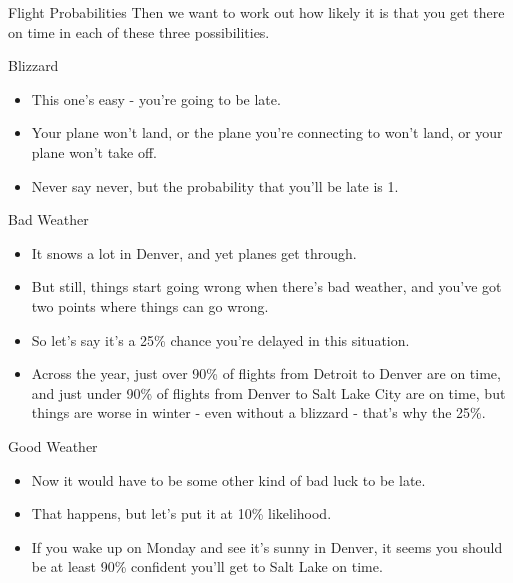 \documentclass[
  ignorenonframetext,
]{beamer}
\providecommand{\tightlist}{%
  \setlength{\itemsep}{0pt}\setlength{\parskip}{0pt}}
\renewcommand{\,}{\text{, }}
\begin{document}
\begin{frame}{Flight Probabilities}
\protect\hypertarget{flight-probabilities}{}
Then we want to work out how likely it is that you get there on time in
each of these three possibilities.
\end{frame}

\begin{frame}{Blizzard}
\protect\hypertarget{blizzard}{}
\begin{itemize}
\tightlist
\item
  This one's easy - you're going to be late.
\item
  Your plane won't land, or the plane you're connecting to won't land,
  or your plane won't take off.
\item
  Never say never, but the probability that you'll be late is 1.
\end{itemize}
\end{frame}

\begin{frame}{Bad Weather}
\protect\hypertarget{bad-weather}{}
\begin{itemize}
\tightlist
\item
  It snows a lot in Denver, and yet planes get through.
\item
  But still, things start going wrong when there's bad weather, and
  you've got two points where things can go wrong.
\item
  So let's say it's a 25\% chance you're delayed in this situation.
\item
  Across the year, just over 90\% of flights from Detroit to Denver are
  on time, and just under 90\% of flights from Denver to Salt Lake City
  are on time, but things are worse in winter - even without a blizzard
  - that's why the 25\%.
\end{itemize}
\end{frame}

\begin{frame}{Good Weather}
\protect\hypertarget{good-weather}{}
\begin{itemize}
\tightlist
\item
  Now it would have to be some other kind of bad luck to be late.
\item
  That happens, but let's put it at 10\% likelihood.
\item
  If you wake up on Monday and see it's sunny in Denver, it seems you
  should be at least 90\% confident you'll get to Salt Lake on time.
\end{itemize}
\end{frame}
\end{document}

